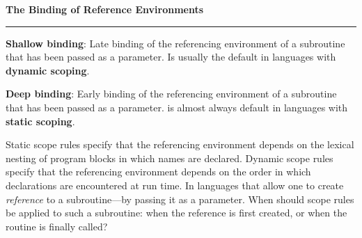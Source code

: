 \nopagenumbers
{\bf The Binding of Reference Environments}
\vskip 1mm
\hrule

\vskip 6pt
{\bf Shallow binding}: Late binding of the referencing environment of a subroutine that has been passed as a parameter. Is usually the default in languages with {\bf dynamic scoping}.

\vskip 6pt
{\bf Deep binding}: Early binding of the referencing environment of a subroutine that has been passed as a parameter. is almost always default in languages with {\bf static scoping}.

\vskip 6pt
Static scope rules specify that the referencing environment depends on the lexical nesting of program blocks in which names are declared. Dynamic scope rules specify that the referencing environment depends on the order in which declarations are encountered at run time. In languages that allow one to create {\it reference} to a subroutine---by passing it as a parameter. When should scope rules be applied to such a subroutine: when the reference is first created, or when the routine is finally called?

\vfill\eject
\bye
